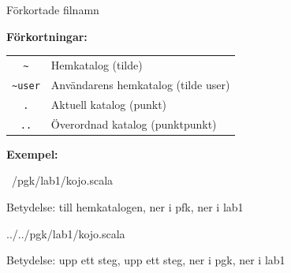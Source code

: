 




\begin{Slide}{Förkortade filnamn}\SlideFontSmall

    \textbf{Förkortningar:}


    \blankline
        \begin{tabular}{cl}
            \texttt{\textasciitilde}     & Hemkatalog (tilde)              \\
            \texttt{\textasciitilde{}user} & Användarens hemkatalog (tilde user)          \\
            \texttt{.}    & Aktuell katalog (punkt)         \\
            \texttt{..}   & Överordnad katalog (punktpunkt) \\
        \end{tabular}
    \blankline

    \noindent\textbf{Exempel:}


\begin{Code}[language=]
~/pgk/lab1/kojo.scala       
\end{Code}
Betydelse: till hemkatalogen, ner i pfk, ner i lab1
\begin{Code}[language=]
../../pgk/lab1/kojo.scala
\end{Code}
Betydelse: upp ett steg, upp ett steg, ner i pgk, ner i lab1

\end{Slide}

